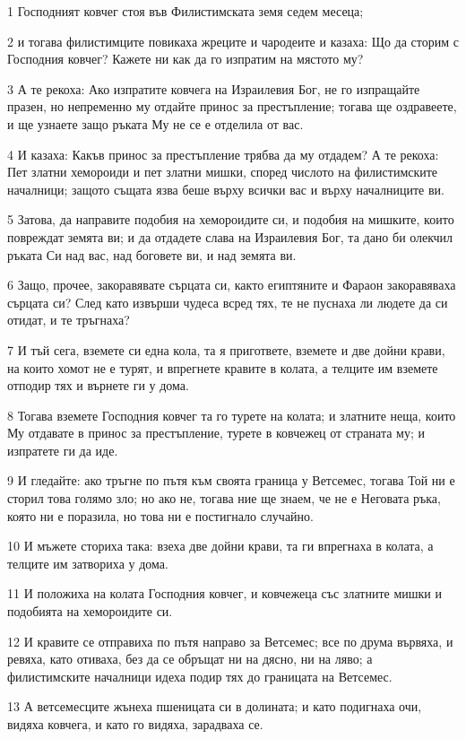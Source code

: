 \par 1 Господният ковчег стоя във Филистимската земя седем месеца;
\par 2 и тогава филистимците повикаха жреците и чародеите и казаха: Що да сторим с Господния ковчег? Кажете ни как да го изпратим на мястото му?
\par 3 А те рекоха: Ако изпратите ковчега на Израилевия Бог, не го изпращайте празен, но непременно му отдайте принос за престъпление; тогава ще оздравеете, и ще узнаете защо ръката Му не се е отделила от вас.
\par 4 И казаха: Какъв принос за престъпление трябва да му отдадем? А те рекоха: Пет златни хемороиди и пет златни мишки, според числото на филистимските началници; защото същата язва беше върху всички вас и върху началниците ви.
\par 5 Затова, да направите подобия на хемороидите си, и подобия на мишките, които повреждат земята ви; и да отдадете слава на Израилевия Бог, та дано би олекчил ръката Си над вас, над боговете ви, и над земята ви.
\par 6 Защо, прочее, закоравявате сърцата си, както египтяните и Фараон закоравяваха сърцата си? След като извърши чудеса всред тях, те не пуснаха ли людете да си отидат, и те тръгнаха?
\par 7 И тъй сега, вземете си една кола, та я пригответе, вземете и две дойни крави, на които хомот не е турят, и впрегнете кравите в колата, а телците им вземете отподир тях и върнете ги у дома.
\par 8 Тогава вземете Господния ковчег та го турете на колата; и златните неща, които Му отдавате в принос за престъпление, турете в ковчежец от страната му; и изпратете ги да иде.
\par 9 И гледайте: ако тръгне по пътя към своята граница у Ветсемес, тогава Той ни е сторил това голямо зло; но ако не, тогава ние ще знаем, че не е Неговата ръка, която ни е поразила, но това ни е постигнало случайно.
\par 10 И мъжете сториха така: взеха две дойни крави, та ги впрегнаха в колата, а телците им затвориха у дома.
\par 11 И положиха на колата Господния ковчег, и ковчежеца със златните мишки и подобията на хемороидите си.
\par 12 И кравите се отправиха по пътя направо за Ветсемес; все по друма вървяха, и ревяха, като отиваха, без да се обръщат ни на дясно, ни на ляво; а филистимските началници идеха подир тях до границата на Ветсемес.
\par 13 А ветсемесците жънеха пшеницата си в долината; и като подигнаха очи, видяха ковчега, и като го видяха, зарадваха се.
